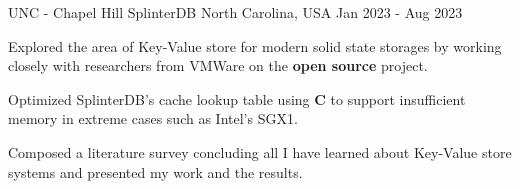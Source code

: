 

\begin{cventries}

  \cventry
    {UNC - Chapel Hill} %
    {SplinterDB} %
    {North Carolina, USA} %
    {Jan 2023 - Aug 2023} %
    {
      \begin{cvitems} %
        \item {Explored the area of Key-Value store for modern solid state storages by working closely with researchers from VMWare on the \textbf{open source} project.}
        \item {Optimized SplinterDB's cache lookup table using \textbf{C} to support insufficient memory in extreme cases such as Intel's SGX1.}
        \item {Composed a literature survey concluding all I have learned about Key-Value store systems and presented my work and the results.}
      \end{cvitems}
    }


\end{cventries}

